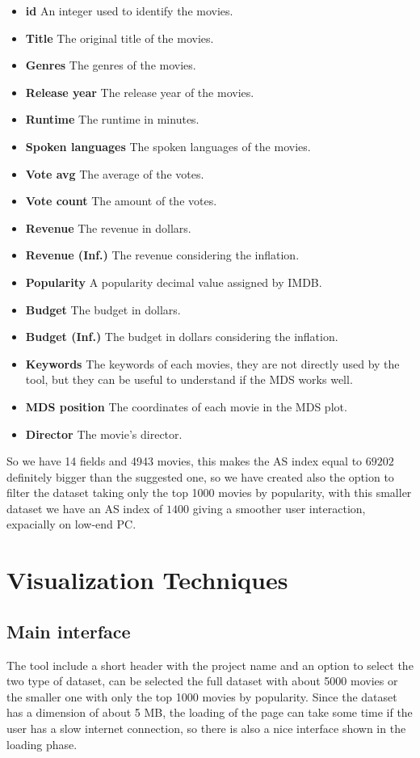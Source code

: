 \documentclass[]{article}
\begin{document}
\begin{itemize}
	\item \textbf{id} An integer used to identify the movies.
	\item \textbf{Title} The original title of the movies.
	\item \textbf{Genres} The genres of the movies.
	\item \textbf{Release year} The release year of the movies.
	\item \textbf{Runtime} The runtime in minutes.
	\item \textbf{Spoken languages} The spoken languages of the movies.
	\item \textbf{Vote avg} The average of the votes.
	\item \textbf{Vote count} The amount of the votes.
	\item \textbf{Revenue} The revenue in dollars.
	\item \textbf{Revenue (Inf.)} The revenue considering the inflation.
	\item \textbf{Popularity} A popularity decimal value assigned by IMDB.
	\item \textbf{Budget} The budget in dollars.
	\item \textbf{Budget (Inf.)} The budget in dollars considering the inflation.
	\item \textbf{Keywords}	The keywords of each movies, they are not directly used by the tool, but they can be useful to understand if the MDS works well.
	\item \textbf{MDS position} The coordinates of each movie in the MDS plot.
	\item \textbf{Director} The movie's director.
\end{itemize}
So we have 14 fields and 4943 movies, this makes the AS index equal to $69202$ definitely bigger than the suggested one, so we have created also the option to filter the dataset taking only the top 1000 movies by popularity, with this smaller dataset we have an AS index of $1400$ giving a smoother user interaction, expacially on low-end PC.\newline
\section{Visualization Techniques}
\subsection{Main interface}
The tool include a short header with the project name and an option to select the two type of dataset, can be selected the full dataset with about 5000 movies or the smaller one with only the top 1000 movies by popularity.\newline
Since the dataset has a dimension of about 5 MB, the loading of the page can take some time if the user has a slow internet connection, so there is also a nice interface shown in the loading phase.
\end{document}
